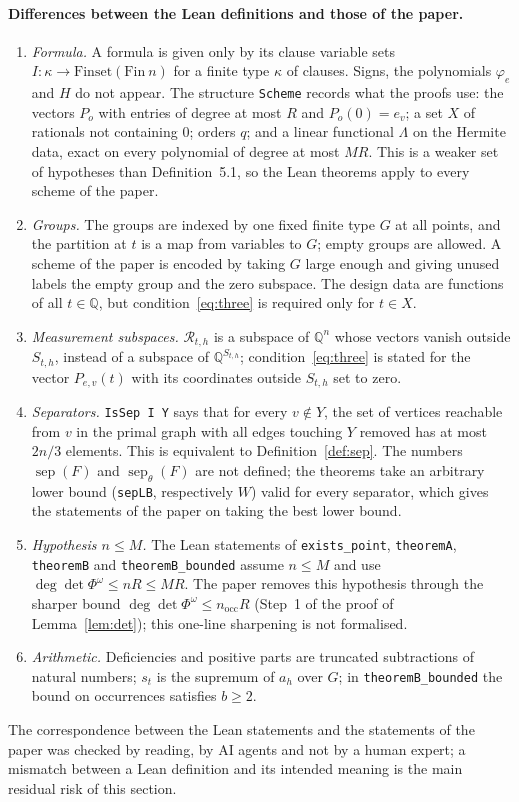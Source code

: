 \documentclass[11pt,a4paper]{article}
\theoremstyle{definition}
\theoremstyle{remark}
\newcommand{\Q}{\mathbb{Q}}
\newcommand{\cR}{\mathcal{R}}
\newcommand{\sep}{\operatorname{sep}}
\newcommand{\sepw}{\operatorname{sep}_{\theta}}
\newcommand{\nocc}{n_{\mathrm{occ}}}
\begin{document}
\paragraph{Differences between the Lean definitions and those of the paper.}
\begin{enumerate}
\item \emph{Formula.} A formula is given only by its clause variable sets
 $I:\kappa\to\mathrm{Finset}(\mathrm{Fin}\ n)$ for a finite type $\kappa$ of clauses. Signs,
 the polynomials $\varphi_e$ and $H$ do not appear. The structure \texttt{Scheme} records
 what the proofs use: the vectors $P_o$ with entries of degree at most $R$ and
 $P_o(0)=e_v$; a set $X$ of rationals not containing $0$; orders $q$; and a linear functional
 $\Lambda$ on the Hermite data, exact on every polynomial of degree at most $MR$. This is a
 weaker set of hypotheses than Definition~5.1, so the Lean theorems apply to every scheme of
 the paper.
\item \emph{Groups.} The groups are indexed by one fixed finite type $G$ at all points, and
 the partition at $t$ is a map from variables to $G$; empty groups are allowed. A scheme of
 the paper is encoded by taking $G$ large enough and giving unused labels the empty group
 and the zero subspace. The design data are functions of all $t\in\Q$, but
 condition~\eqref{eq:three} is required only for $t\in X$.
\item \emph{Measurement subspaces.} $\cR_{t,h}$ is a subspace of $\Q^n$ whose vectors vanish
 outside $S_{t,h}$, instead of a subspace of $\Q^{S_{t,h}}$; condition~\eqref{eq:three} is
 stated for the vector $P_{e,v}(t)$ with its coordinates outside $S_{t,h}$ set to zero.
\item \emph{Separators.} \texttt{IsSep I Y} says that for every $v\notin Y$, the set of
 vertices reachable from $v$ in the primal graph with all edges touching $Y$ removed has at
 most $2n/3$ elements. This is equivalent to Definition~\ref{def:sep}. The numbers
 $\sep(F)$ and $\sepw(F)$ are not defined; the theorems take an arbitrary lower bound
 (\texttt{sepLB}, respectively $W$) valid for every separator, which gives the statements
 of the paper on taking the best lower bound.
\item \emph{Hypothesis $n\le M$.} The Lean statements of \texttt{exists\_point},
 \texttt{theoremA}, \texttt{theoremB} and \texttt{theoremB\_bounded} assume $n\le M$ and use
 $\deg\det\Phi^\omega\le nR\le MR$. The paper removes this hypothesis through the sharper
 bound $\deg\det\Phi^\omega\le\nocc R$ (Step~1 of the proof of Lemma~\ref{lem:det}); this
 one-line sharpening is not formalised.
\item \emph{Arithmetic.} Deficiencies and positive parts are truncated subtractions of
 natural numbers; $s_t$ is the supremum of $a_h$ over $G$; in \texttt{theoremB\_bounded} the
 bound on occurrences satisfies $b\ge2$.
\end{enumerate}
The correspondence between the Lean statements and the statements of the paper was checked
by reading, by AI agents and not by a human expert; a mismatch between a Lean definition and
its intended meaning is the main residual risk of this section.
\end{document}

